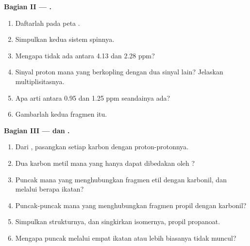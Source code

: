 \begin{problem}
\medskip\noindent\textbf{Bagian II --- .}
\begin{enumerate}[resume, beginpenalty=10000]
  \item Daftarlah  pada peta .
  \item Simpulkan kedua sistem spinnya.
  \item Mengapa tidak ada  antara 4.13 dan 2.28 ppm?
  \item Sinyal proton mana yang berkopling dengan dua sinyal lain? Jelaskan
        multiplisitasnya.
  \item Apa arti  antara 0.95 dan 1.25 ppm seandainya ada?
  \item Gambarlah kedua fragmen itu.
\end{enumerate}

\medskip\noindent\textbf{Bagian III ---  dan .}
\begin{enumerate}[resume, beginpenalty=10000]
  \item Dari , pasangkan setiap karbon dengan proton-protonnya.
  \item Dua karbon metil mana yang hanya dapat dibedakan oleh ?
  \item Puncak  mana yang menghubungkan fragmen etil dengan karbonil, dan
        melalui berapa ikatan?
  \item Puncak-puncak  mana yang menghubungkan fragmen propil dengan
        karbonil?
  \item Simpulkan strukturnya, dan singkirkan isomernya, propil propanoat.
  \item Mengapa puncak  melalui empat ikatan atau lebih biasanya tidak
        muncul?
\end{enumerate}


\end{problem}
